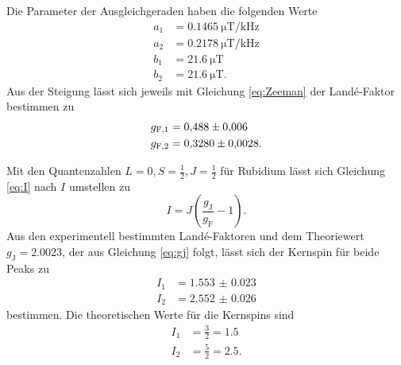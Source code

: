 Die Parameter der Ausgleichgeraden haben die folgenden Werte
\begin{align*}
    a_1 &= \SI{0.1465}{\micro\tesla\per\kilo\hertz} \\
    a_2 &= \SI{0.2178}{\micro\tesla\per\kilo\hertz} \\
    b_1 &= \SI{21.6}{\micro\tesla} \\
    b_2 &= \SI{21.6}{\micro\tesla}.
\end{align*}
Aus der Steigung lässt sich jeweils mit Gleichung \ref{eq:Zeeman} der Landé-Faktor bestimmen zu
\begin{align*}
    g_{\text{F},1} &= \num{0.488 \pm 0.006} \\
    g_{\text{F},2} &= \num{0.3280 \pm 0.0028}.
\end{align*}

Mit den Quantenzahlen $L = 0, S = \frac{1}{2}, J = \frac{1}{2}$ für Rubidium lässt sich Gleichung \ref{eq:I} nach $I$ umstellen zu
\begin{equation*}
    I = J \left( \frac{g_\text{J}}{g_\text{F}} -1 \right).
\end{equation*} 
Aus den experimentell bestimmten Landé-Faktoren und dem Theoriewert $g_\text{J} = \num{2.0023}$, der aus Gleichung \ref{eq:gj} folgt, lässt sich der Kernspin für beide Peaks zu
\begin{align*}
    I_1 &= \num{1.553(23)} \\
    I_2 &= \num{2.552(26)}
\end{align*}
bestimmen. 
Die theoretischen Werte für die Kernspins sind
\begin{align*}
    I_1 &= \frac{3}{2} = \num{1.5} \\
    I_2 &= \frac{5}{2} = \num{2.5}.
\end{align*}


